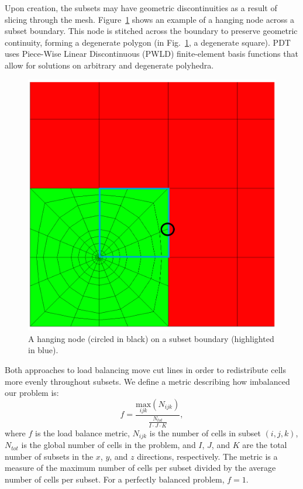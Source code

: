 \documentclass[times,final]{elsarticle}
\begin{document}
Upon creation, the subsets may have geometric discontinuities as a result of slicing through the mesh.
Figure~\ref{hanging_node} shows an example of a hanging node across a subset boundary.
This node is stitched across the boundary to preserve geometric continuity, forming a degenerate polygon \cite{degenerate} (in Fig.~\ref{hanging_node}, a degenerate square).
PDT uses Piece-Wise Linear Discontinuous (PWLD) finite-element basis functions \cite{pwld_ragusa,pwld_teresa} that allow for solutions on arbitrary and degenerate polyhedra.
\begin{figure}[H]
  \centering
  \includegraphics[scale=0.2]{../figures/hanging_node_spiderweb_example.png}
   \caption{A hanging node (circled in black) on a subset boundary (highlighted in blue).}
   \label{hanging_node}
\end{figure}

Both approaches to load balancing move cut lines in order to redistribute cells more evenly throughout subsets. We define a metric describing how imbalanced our problem is:
\begin{equation}
f =\frac{\underset{ijk}{\text{max}}(N_{ijk})}{\frac{N_{tot}}{I\cdot J\cdot K}},
\label{metric_def}
\end{equation}
where $f$ is the load balance metric, $N_{ijk}$ is the number of cells in subset $(i,j,k)$, $N_{tot}$ is the global number of cells in the problem, and $I$, $J$, and $K$ are the total number of subsets in the $x$, $y$, and $z$ directions, respectively. The metric is a measure of the maximum number of cells per subset divided by the average number of cells per subset. For a perfectly balanced problem, $f = 1$.
\end{document}
